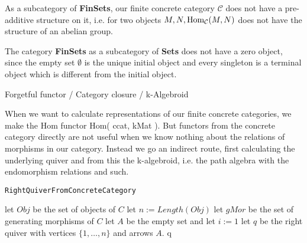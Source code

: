 As a subcategory of \textbf{FinSets}, our finite concrete category $\mathcal{C}$ does not have a pre-additive structure on it, i.e. for
two objects $M,N, \textup{Hom}_{\mathcal{C}}(M,N)$ does not have the structure of an abelian group.

The category \textbf{FinSets} as a subcategory of \textbf{Sets} does not have a zero object, since the empty set $\emptyset$ is the
unique initial object and every singleton is a terminal object which is different from the initial object.

\begin{example}
Forgetful functor / Category closure / k-Algebroid
\end{example}

When we want to calculate representations of our finite concrete categories, we make the Hom functor Hom( ccat, kMat ).
But functors from the concrete category directly are not useful when we know nothing about the relations of morphisms
in our category.
Instead we go an indirect route, first calculating the underlying quiver and from this the k-algebroid, i.e. the path algebra
with the endomorphism relations and such.

\begin{algorithm}\capstart
    \caption{\texttt{RightQuiverFromConcreteCategory}}\label{algo:RightQuiverFromConcreteCategory}
	\BlankLine
	let $Obj$ be the set of objects of $C$\;
	let $n := Length(Obj)$\;
	let $gMor$ be the set of generating morphisms of $C$\;
	let $A$ be the empty set and let $i := 1$\;
	\BlankLine
	let $q$ be the right quiver with vertices $\{1,\dots,n\}$ and arrows $A$.
	\BlankLine
	\Return q\;
\end{algorithm}
